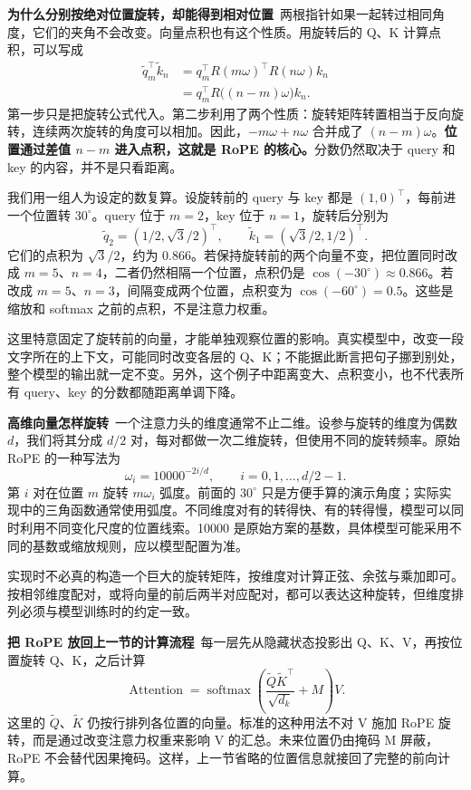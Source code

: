 \textbf{为什么分别按绝对位置旋转，却能得到相对位置}~两根指针如果一起转过相同角度，它们的夹角不会改变。向量点积也有这个性质。用旋转后的 Q、K 计算点积，可以写成
\[
\begin{aligned}
\widetilde q_m^{\top}\widetilde k_n
&=q_m^{\top}R(m\omega)^{\top}R(n\omega)k_n\\
&=q_m^{\top}R\bigl((n-m)\omega\bigr)k_n.
\end{aligned}
\]
第一步只是把旋转公式代入。第二步利用了两个性质：旋转矩阵转置相当于反向旋转，连续两次旋转的角度可以相加。因此，\(-m\omega+n\omega\) 合并成了 \((n-m)\omega\)。\textbf{位置通过差值 \(n-m\) 进入点积，这就是 RoPE 的核心。}分数仍然取决于 query 和 key 的内容，并不是只看距离。

我们用一组人为设定的数复算。设旋转前的 query 与 key 都是 \((1,0)^{\top}\)，每前进一个位置转 \(30^{\circ}\)。query 位于 \(m=2\)，key 位于 \(n=1\)，旋转后分别为
\[
\widetilde q_2=(1/2,\sqrt{3}/2)^{\top},\qquad
\widetilde k_1=(\sqrt{3}/2,1/2)^{\top}.
\]
它们的点积为 \(\sqrt{3}/2\)，约为 0.866。若保持旋转前的两个向量不变，把位置同时改成 \(m=5\)、\(n=4\)，二者仍然相隔一个位置，点积仍是 \(\cos(-30^{\circ})\approx0.866\)。若改成 \(m=5\)、\(n=3\)，间隔变成两个位置，点积变为 \(\cos(-60^{\circ})=0.5\)。这些是缩放和 softmax 之前的点积，不是注意力权重。

这里特意固定了旋转前的向量，才能单独观察位置的影响。真实模型中，改变一段文字所在的上下文，可能同时改变各层的 Q、K；不能据此断言把句子挪到别处，整个模型的输出就一定不变。另外，这个例子中距离变大、点积变小，也不代表所有 query、key 的分数都随距离单调下降。

\textbf{高维向量怎样旋转}~一个注意力头的维度通常不止二维。设参与旋转的维度为偶数 \(d\)，我们将其分成 \(d/2\) 对，每对都做一次二维旋转，但使用不同的旋转频率。原始 RoPE 的一种写法为
\[
\omega_i=10000^{-2i/d},\qquad
i=0,1,\ldots,d/2-1.
\]
第 \(i\) 对在位置 \(m\) 旋转 \(m\omega_i\) 弧度。前面的 \(30^{\circ}\) 只是方便手算的演示角度；实际实现中的三角函数通常使用弧度。不同维度对有的转得快、有的转得慢，模型可以同时利用不同变化尺度的位置线索。10000 是原始方案的基数，具体模型可能采用不同的基数或缩放规则，应以模型配置为准。

实现时不必真的构造一个巨大的旋转矩阵，按维度对计算正弦、余弦与乘加即可。按相邻维度配对，或将向量的前后两半对应配对，都可以表达这种旋转，但维度排列必须与模型训练时的约定一致。

\textbf{把 RoPE 放回上一节的计算流程}~每一层先从隐藏状态投影出 Q、K、V，再按位置旋转 Q、K，之后计算
\[
\operatorname{Attention}
=\operatorname{softmax}\left(
\frac{\widetilde Q\widetilde K^{\top}}{\sqrt{d_k}}+M
\right)V.
\]
这里的 \(\widetilde Q\)、\(\widetilde K\) 仍按行排列各位置的向量。标准的这种用法不对 V 施加 RoPE 旋转，而是通过改变注意力权重来影响 V 的汇总。未来位置仍由掩码 M 屏蔽，RoPE 不会替代因果掩码。这样，上一节省略的位置信息就接回了完整的前向计算。

